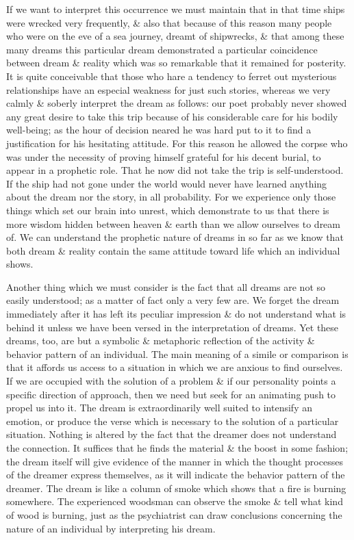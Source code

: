 \documentclass{article}
\begin{document}
If we want to interpret this occurrence we must maintain that in that time ships were wrecked very frequently, \& also that because of this reason many people who were on the eve of a sea journey, dreamt of shipwrecks, \& that among these many dreams this particular dream demonstrated a particular coincidence between dream \& reality which was so remarkable that it remained for posterity. It is quite conceivable that those who hare a tendency to ferret out mysterious relationships have an especial weakness for just such stories, whereas we very calmly \& soberly interpret the dream as follows: our poet probably never showed any great desire to take this trip because of his considerable care for his bodily well-being; as the hour of decision neared he was hard put to it to find a justification for his hesitating attitude. For this reason he allowed the corpse who was under the necessity of proving himself grateful for his decent burial, to appear in a prophetic role. That he now did not take the trip is self-understood. If the ship had not gone under the world would never have learned anything about the dream nor the story, in all probability. For we experience only those things which set our brain into unrest, which demonstrate to us that there is more wisdom hidden between heaven \& earth than we allow ourselves to dream of. We can understand the prophetic nature of dreams in so far as we know that both dream \& reality contain the same attitude toward life which an individual shows.

Another thing which we must consider is the fact that all dreams are not so easily understood; as a matter of fact only a very few are. We forget the dream immediately after it has left its peculiar impression \& do not understand what is behind it unless we have been versed in the interpretation of dreams. Yet these dreams, too, are but a symbolic \& metaphoric reflection of the activity \& behavior pattern of an individual. The main meaning of a simile or comparison is that it affords us access to a situation in which we are anxious to find ourselves. If we are occupied with the solution of a problem \& if our personality points a specific direction of approach, then we need but seek for an animating push to propel us into it. The dream is extraordinarily well suited to intensify an emotion, or produce the verse which is necessary to the solution of a particular situation. Nothing is altered by the fact that the dreamer does not understand the connection. It suffices that he finds the material \& the boost in some fashion; the dream itself will give evidence of the manner in which the thought processes of the dreamer express themselves, as it will indicate the behavior pattern of the dreamer. The dream is like a column of smoke which shows that a fire is burning somewhere. The experienced woodsman can observe the smoke \& tell what kind of wood is burning, just as the psychiatrist can draw conclusions concerning the nature of an individual by interpreting his dream.
\end{document}
